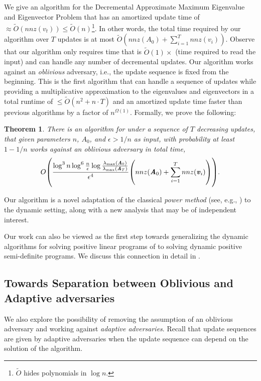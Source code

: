 \documentclass[11pt]{article}
\newtheorem{theorem}{Theorem}[section]
\let\originalleft\left
\let\originalright\right
\renewcommand{\left}{\mathopen{}\mathclose\bgroup\originalleft}
\renewcommand{\right}{\aftergroup\egroup\originalright}
\newcommand\vv{\boldsymbol{\mathit{v}}}
\renewcommand\AA{\boldsymbol{\mathit{A}}}
\newcommand\Otil{\widetilde{O}}
\begin{document}
We give an algorithm for the Decremental Approximate Maximum Eigenvalue and Eigenvector Problem that has an amortized update time of $\approx \Otil(nnz(\vv_t))\leq \Otil(n)$\footnote{$\Otil$ hides polynomials in $\log n$.}. In other words, the total time required by our algorithm over $T$ updates is at most $\Otil(nnz(\AA_0) + \sum_{i=1}^T nnz(\vv_i))$. Observe that our algorithm only requires time that is $\Otil(1) \times$ (time required to read the input) and can handle any number of decremental updates. Our algorithm works against an {\it oblivious} adversary, i.e., the update sequence is fixed from the beginning. This is the first algorithm that can handle a sequence of updates while providing a multiplicative approximation to the eigenvalues and eigenvectors in a total runtime of $\leq \Otil(n^2 + n\cdot T)$ and an amortized update time faster than previous algorithms by a factor of $n^{\Omega(1)}$. Formally, we prove the following:
\begin{theorem}
	\label{thm:upper}There is an algorithm for  under a sequence of $T$ decreasing updates, that given parameters $n$, $\AA_0$, and $\epsilon>1/n$ as input, with probability at least $1-1/n$ works against an oblivious adversary in total time,
 \[
 O\left(\frac{\log^{3}n \log^6 \frac{n}{\epsilon}\log \frac{\lambda_{\max}(\AA_0)}{\lambda_{\max}(\AA_T)}}{\epsilon^{4}}\left(nnz(\AA_0) + \sum_{i=1}^T nnz(\vv_i)\right) \right).
 \]
\end{theorem}

 Our algorithm is a novel adaptation of the classical {\it power method} (see, e.g., \cite{trefethen2022numerical}) 
 to the dynamic setting, along with a new analysis that may be of independent interest. 

 Our work can also be viewed as the first step towards generalizing the dynamic algorithms for solving positive linear programs of \cite{bhattacharya2023dynamic} to solving dynamic positive semi-definite programs. We discuss this connection in detail in .

\subsection{Towards Separation between Oblivious and Adaptive adversaries}
 We also explore the possibility of removing the assumption of an oblivious adversary and working against {\it adaptive adversaries}. Recall that update sequences are given by adaptive adversaries when the update sequence can depend on the solution of the algorithm. 
 
\end{document}
